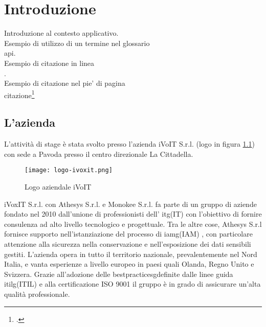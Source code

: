 
\chapter{Introduzione}
\label{cap:introduzione}

Introduzione al contesto applicativo.\\

\noindent Esempio di utilizzo di un termine nel glossario \\
\gls{api}. \\

\noindent Esempio di citazione in linea \\
\cite{site:agile-manifesto}. \\

\noindent Esempio di citazione nel pie' di pagina \\
citazione\footcite{womak:lean-thinking} \\

\section{L'azienda}

L'attività di stage è stata svolto presso l'azienda iVoIT S.r.l. (logo in figura \ref{fig:Logo-iVoIT}) con sede a Pavoda presso il 
centro direzionale La Cittadella. 
\begin{figure}[!h]
    
    \centering
    \texttt{[image: logo-ivoxit.png]} 
    \caption{Logo aziendale iVoIT}
    \label{fig:Logo-iVoIT} 
\end{figure}
iVoxIT S.r.l. con Athesys S.r.l. e Monokee S.r.l. fa parte di un gruppo di aziende fondato nel 2010 dall’unione di professionisti dell’  \gls{itg}\glsfirstoccur (IT) con l’obiettivo di fornire consulenza ad alto livello tecnologico e progettuale. Tra le altre cose, Athesys S.r.l fornisce supporto
nell’istanziazione del processo di \gls{iamg}\glsfirstoccur (IAM) , con particolare
attenzione alla sicurezza nella conservazione e nell’esposizione dei dati sensibili gestiti.
L’azienda opera in tutto il territorio nazionale, prevalentemente nel Nord Italia, e
vanta esperienze a livello europeo in paesi quali Olanda, Regno Unito e Svizzera.
Grazie all’adozione delle \gls{bestpracticesg}\glsfirstoccur definite dalle linee guida \gls{itilg}\glsfirstoccur (ITIL)  e alla certificazione ISO 9001 il gruppo è
in grado di assicurare un’alta qualità professionale.

